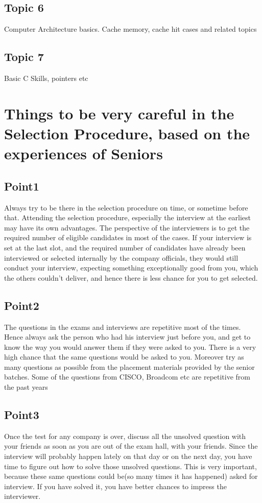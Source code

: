 \documentclass[a4paper,10pt]{article}
\begin{document}
\subsection*{Topic 6}
Computer Architecture basics. Cache memory, cache hit cases and related topics

\subsection*{Topic 7} Basic C Skills, pointers etc

\section*{Things to be very careful in the Selection Procedure, based on the experiences of Seniors}

\subsection*{Point1}
Always try to be there in the selection procedure on time, or sometime before that. Attending the selection procedure, especially the interview at the earliest may have its own  advantages.
The perspective of the interviewers is to get the required number of eligible candidates in most of the cases. If your interview is set at the last slot, and the required number of candidates
have already been interviewed or selected internally by the company officials, they would still conduct your interview, expecting something exceptionally good from you, which the others couldn’t deliver, 
and hence there is less chance for you to get selected.

\subsection*{Point2} 
The questions in the exams and interviews are repetitive most of the times. Hence always ask the person who had his interview just before you, and get to know the way you would answer them if they were asked to you. 
There is a very high chance that the same questions would be asked to you. Moreover try as many questions as possible from the placement materials provided by the senior batches. Some of the questions from CISCO, 
Broadcom etc are repetitive from the past years

\subsection*{Point3} 
Once the test for any company is over, discuss all the unsolved question with your friends as soon as you are out of the exam hall, with your friends. Since the interview will probably happen lately on that day or on the next day,
you have time to figure out how to solve those unsolved questions. This is very important, because these same questions could be(so many times it has happened) asked for interview. If you have solved it, you have better chances to impress the interviewer.
\end{document}
